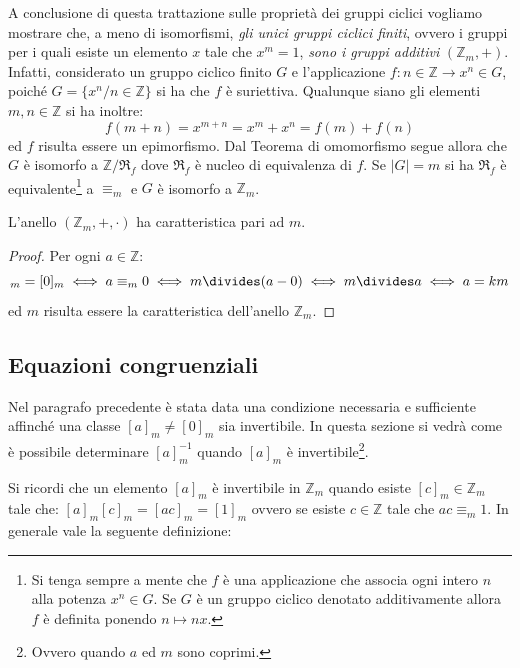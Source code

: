 A conclusione di questa trattazione sulle proprietà dei gruppi ciclici vogliamo mostrare che, a meno di isomorfismi, \emph{gli unici gruppi ciclici finiti}, ovvero i gruppi per i quali esiste un elemento $x$ tale che $x^{m}=1$, \emph{sono i gruppi additivi} $(\mathbb{Z}_{m},+)$. Infatti, considerato un gruppo ciclico finito $G$ e l'applicazione $f: n \in \mathbb{Z} \rightarrow x^{n} \in G$, poiché $G=\{x^{n} / n \in \mathbb{Z}\}$ si ha che $f$ è suriettiva. Qualunque siano gli elementi $m,n \in \mathbb{Z}$ si ha inoltre:
\begin{displaymath}
	f(m+n)= x^{m+n}=x^{m}+x^{n}=f(m)+f(n)
\end{displaymath}
ed $f$ risulta essere un epimorfismo. Dal Teorema di omomorfismo segue allora che $G$ è isomorfo a $\mathbb{Z}/{\mathfrak{R}_{f}}$ dove $\mathfrak{R}_{f}$ è nucleo di equivalenza di $f$. Se $|G|=m$ si ha $\mathfrak{R}_{f}$ è equivalente\footnote{Si tenga sempre a mente che $f$ è una applicazione che associa ogni intero $n$ alla potenza $x^{n} \in G$. Se $G$ è un gruppo ciclico denotato additivamente allora $f$ è definita ponendo $n \mapsto nx$.} a $\equiv_{m}$ e $G$ è isomorfo a $\mathbb{Z}_{m}$.

\begin{corolbox}
	L'anello $(\mathbb{Z}_{m},+,\cdot)$ ha caratteristica pari ad $m$.
\end{corolbox}
\begin{proof}
	Per ogni $a \in \mathbb{Z}$:
	\begin{displaymath}
		[a]_{m} = [0]_{m} \iff a \equiv_{m} 0 \iff m \divides (a-0) \iff m \divides a \iff a =km
	\end{displaymath}
	ed $m$ risulta essere la caratteristica dell'anello $\mathbb{Z}_{m}$.
\end{proof}

\subsection{Equazioni congruenziali}
Nel paragrafo precedente è stata data una condizione necessaria e sufficiente affinché una classe $[a]_{m} \neq [0]_{m}$ sia invertibile. In questa sezione si vedrà come è possibile determinare $[a]_{m}^{-1}$ quando $[a]_{m}$ è invertibile\footnote{Ovvero quando $a$ ed $m$ sono coprimi.}.

Si ricordi che un elemento $[a]_{m}$ è invertibile in $\mathbb{Z}_{m}$ quando esiste $[c]_{m} \in \mathbb{Z}_{m}$ tale che: $[a]_{m}[c]_{m}=[ac]_{m}=[1]_{m}$ ovvero se esiste $c \in \mathbb{Z}$ tale che $ac \equiv_{m} 1$. In generale vale la seguente definizione:

